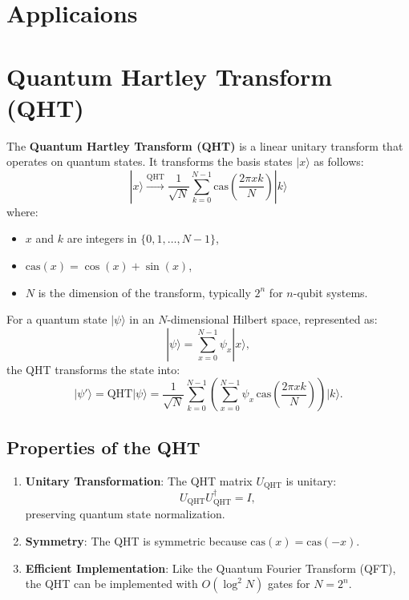 \documentclass[11pt]{article}
\theoremstyle{definition}
\begin{document}
\section{Applicaions}


\section*{Quantum Hartley Transform (QHT)}

The \textbf{Quantum Hartley Transform (QHT)} is a linear unitary transform that operates on quantum states. It transforms the basis states \( |x\rangle \) as follows:
\[
|x\rangle \xrightarrow{\text{QHT}} \frac{1}{\sqrt{N}} \sum_{k=0}^{N-1} \text{cas}\left(\frac{2\pi x k}{N}\right) |k\rangle
\]
where:
\begin{itemize}
    \item \( x \) and \( k \) are integers in \( \{0, 1, \dots, N-1\} \),
    \item \( \text{cas}(x) = \cos(x) + \sin(x) \),
    \item \( N \) is the dimension of the transform, typically \( 2^n \) for \( n \)-qubit systems.
\end{itemize}

For a quantum state \( |\psi\rangle \) in an \( N \)-dimensional Hilbert space, represented as:
\[
|\psi\rangle = \sum_{x=0}^{N-1} \psi_x |x\rangle,
\]
the QHT transforms the state into:
\[
|\psi'\rangle = \text{QHT} |\psi\rangle = \frac{1}{\sqrt{N}} \sum_{k=0}^{N-1} \left( \sum_{x=0}^{N-1} \psi_x \, \text{cas}\left(\frac{2\pi x k}{N}\right) \right) |k\rangle.
\]

\subsection*{Properties of the QHT}
\begin{enumerate}
    \item \textbf{Unitary Transformation}: The QHT matrix \( U_{\text{QHT}} \) is unitary:
    \[
    U_{\text{QHT}} U_{\text{QHT}}^\dagger = I,
    \]
    preserving quantum state normalization.
    \item \textbf{Symmetry}: The QHT is symmetric because \( \text{cas}(x) = \text{cas}(-x) \).
    \item \textbf{Efficient Implementation}: Like the Quantum Fourier Transform (QFT), the QHT can be implemented with \( O(\log^2 N) \) gates for \( N = 2^n \).
\end{enumerate}
\end{document}
